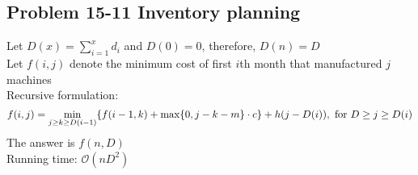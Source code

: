 \subsection*{Problem 15-11 Inventory planning}
\noindent Let $D(x) = \displaystyle{\sum_{i = 1}^{x}} d_i$ and $D(0) = 0$, therefore, $D(n) = D$ \\
Let $f(i, j)$ denote the minimum cost of first $i$th month that manufactured $j$ machines \\
Recursive formulation:
\begin{equation} \notag
	f(i, j) = \min_{j \geq k \geq D(i - 1)}\{f(i - 1, k) + \max\{0, j - k - m\} \cdot c\} + h(j - D(i)), \mbox{ for } D \geq j \geq D(i)
\end{equation}
The answer is $f(n, D)$ \\
Running time: $\mathcal{O}(nD^2)$

